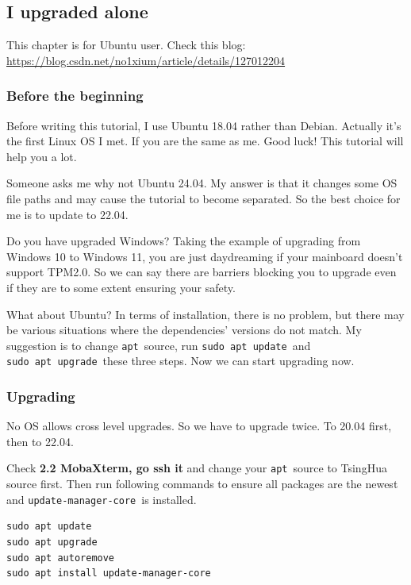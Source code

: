 \documentclass[12pt]{ctexart}
\newenvironment{mdquote}
{%
  \par\noindent
  \begin{list}{}{%
      \setlength{\leftmargin}{1em}%
      \setlength{\rightmargin}{0pt}%
      \setlength{\itemindent}{0pt}%
      \setlength{\listparindent}{\parindent}%
      \setlength{\topsep}{0.5\baselineskip}%
  }
  \item[\textbf{>}\ ]\itshape
}
{\end{list}\par}
\begin{document}
\newpage
\subsection{\textbf{I upgraded alone}}

\begin{mdquote}
This chapter is for Ubuntu user. Check this blog:
\url{https://blog.csdn.net/no1xium/article/details/127012204}
\end{mdquote}

\subsubsection{\textbf{Before the beginning}}

Before writing this tutorial, I use Ubuntu 18.04 rather than Debian.
Actually it's the first Linux OS I met. If you are the
same as me. Good luck! This tutorial will help you a lot.

Someone asks me why not Ubuntu 24.04. My answer is that it changes some
OS file paths and may cause the tutorial to become separated. So the
best choice for me is to update to 22.04.

Do you have upgraded Windows? Taking the example of upgrading from
Windows 10 to Windows 11, you are just daydreaming if your mainboard
doesn't support TPM2.0. So we can say there are barriers
blocking you to upgrade even if they are to some extent ensuring your
safety.

What about Ubuntu? In terms of installation, there is no problem, but
there may be various situations where the dependencies'
versions do not match. My suggestion is to change \texttt{apt}\ source,
run \texttt{sudo\ apt\ update}\ and \texttt{sudo\ apt\ upgrade}\ these
three steps. Now we can start upgrading now.

\subsubsection{\textbf{Upgrading}}

No OS allows cross level upgrades. So we have to upgrade twice. To 20.04
first, then to 22.04.

Check \textbf{2.2 MobaXterm, go ssh it} and change your \texttt{apt}\
source to TsingHua source first. Then run following commands to ensure
all packages are the newest and \texttt{update-manager-core}\ is
installed.

\begin{adjustwidth}{2em}{0pt}
\begin{verbatim}
sudo apt update
sudo apt upgrade
sudo apt autoremove
sudo apt install update-manager-core
\end{verbatim}
\end{adjustwidth}
\end{document}
